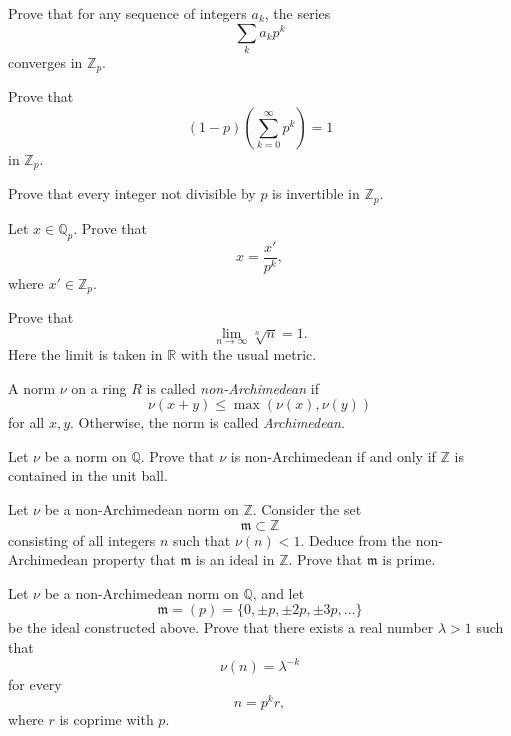 \begin{exercise}
\label{exercise-series-converges-zp}
Prove that for any sequence of integers
$a_k$, the series
$$
\sum_k a_kp^k
$$
converges in $\mathbb Z_p$.
\end{exercise}

\begin{exercise}
\label{exercise-geometric-series-zp}
Prove that
$$
(1-p)\left(\sum_{k=0}^{\infty}p^k\right)=1
$$
in $\mathbb Z_p$.
\end{exercise}

\begin{exercise}
\label{exercise-prime-to-p-invertible-zp}
Prove that every integer not divisible
by $p$ is invertible in $\mathbb Z_p$.
\end{exercise}

\begin{exercise}
\label{exercise-qp-element-fraction-zp}
Let $x \in \mathbb Q_p$. Prove that
$$
x=\frac{x'}{p^k},
$$
where $x' \in \mathbb Z_p$.
\end{exercise}

\begin{exercise}
\label{exercise-root-n-limit}
Prove that
$$
\lim_{n \to \infty}\sqrt[n]{n}=1.
$$
Here the limit is taken in $\mathbb R$
with the usual metric.
\end{exercise}

\begin{definition}
\label{definition-non-archimedean-norm}
A norm $\nu$ on a ring $R$ is called
{\it non-Archimedean} if
$$
\nu(x+y)\leq \max(\nu(x),\nu(y))
$$
for all $x,y$. Otherwise, the norm is
called {\it Archimedean}.
\end{definition}

\begin{exercise}
\label{exercise-non-archimedean-unit-ball}
Let $\nu$ be a norm on $\mathbb Q$.
Prove that $\nu$ is non-Archimedean if
and only if $\mathbb Z$ is contained in
the unit ball.
\end{exercise}

\begin{exercise}
\label{exercise-non-archimedean-prime-ideal}
Let $\nu$ be a non-Archimedean norm on
$\mathbb Z$. Consider the set
$$
\mathfrak m \subset \mathbb Z
$$
consisting of all integers $n$ such
that $\nu(n)<1$. Deduce from the
non-Archimedean property that
$\mathfrak m$ is an ideal in
$\mathbb Z$. Prove that
$\mathfrak m$ is prime.
\end{exercise}

\begin{exercise}
\label{exercise-non-archimedean-powers}
Let $\nu$ be a non-Archimedean norm on
$\mathbb Q$, and let
$$
\mathfrak m=(p)
=
\{0,\pm p,\pm 2p,\pm 3p,\ldots\}
$$
be the ideal constructed above. Prove
that there exists a real number
$\lambda>1$ such that
$$
\nu(n)=\lambda^{-k}
$$
for every
$$
n=p^kr,
$$
where $r$ is coprime with $p$.
\end{exercise}

